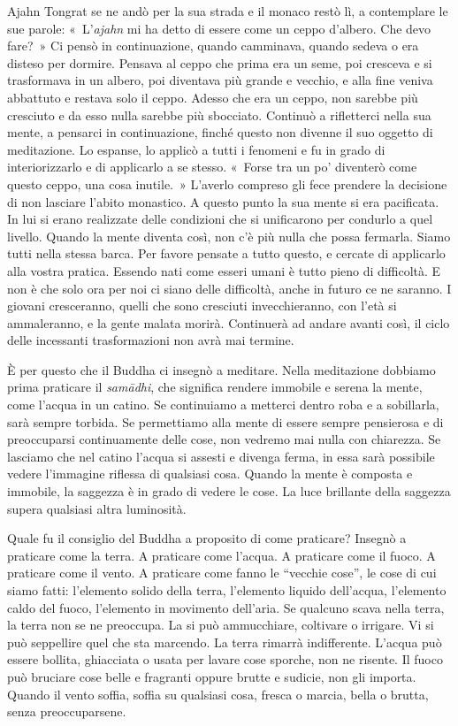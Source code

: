 Ajahn Tongrat se ne andò per la sua strada e il monaco restò lì, a
contemplare le sue parole: «~L'\emph{ajahn} mi ha detto di essere come
un ceppo d'albero. Che devo fare?~» Ci pensò in continuazione, quando
camminava, quando sedeva o era disteso per dormire. Pensava al ceppo che
prima era un seme, poi cresceva e si trasformava in un albero, poi
diventava più grande e vecchio, e alla fine veniva abbattuto e restava
solo il ceppo. Adesso che era un ceppo, non sarebbe più cresciuto e da
esso nulla sarebbe più sbocciato. Continuò a rifletterci nella sua
mente, a pensarci in continuazione, finché questo non divenne il suo
oggetto di meditazione. Lo espanse, lo applicò a tutti i fenomeni e fu
in grado di interiorizzarlo e di applicarlo a se stesso. «~Forse tra un
po' diventerò come questo ceppo, una cosa inutile.~» L'averlo compreso
gli fece prendere la decisione di non lasciare l'abito monastico. A
questo punto la sua mente si era pacificata. In lui si erano realizzate
delle condizioni che si unificarono per condurlo a quel livello. Quando
la mente diventa così, non c'è più nulla che possa fermarla. Siamo tutti
nella stessa barca. Per favore pensate a tutto questo, e cercate di
applicarlo alla vostra pratica. Essendo nati come esseri umani è tutto
pieno di difficoltà. E non è che solo ora per noi ci siano delle
difficoltà, anche in futuro ce ne saranno. I giovani cresceranno, quelli
che sono cresciuti invecchieranno, con l'età si ammaleranno, e la gente
malata morirà. Continuerà ad andare avanti così, il ciclo delle
incessanti trasformazioni non avrà mai termine.

È per questo che il Buddha ci insegnò a meditare. Nella meditazione
dobbiamo prima praticare il \emph{samādhi}, che significa rendere
immobile e serena la mente, come l'acqua in un catino. Se continuiamo a
metterci dentro roba e a sobillarla, sarà sempre torbida. Se permettiamo
alla mente di essere sempre pensierosa e di preoccuparsi continuamente
delle cose, non vedremo mai nulla con chiarezza. Se lasciamo che nel
catino l'acqua si assesti e divenga ferma, in essa sarà possibile vedere
l'immagine riflessa di qualsiasi cosa. Quando la mente è composta e
immobile, la saggezza è in grado di vedere le cose. La luce brillante
della saggezza supera qualsiasi altra luminosità.

Quale fu il consiglio del Buddha a proposito di come praticare? Insegnò
a praticare come la terra. A praticare come l'acqua. A praticare come il
fuoco. A praticare come il vento. A praticare come fanno le ``vecchie
cose'', le cose di cui siamo fatti: l'elemento solido della terra,
l'elemento liquido dell'acqua, l'elemento caldo del fuoco, l'elemento
in movimento dell'aria. Se qualcuno scava nella terra, la terra non se
ne preoccupa. La si può ammucchiare, coltivare o irrigare. Vi si può
seppellire quel che sta marcendo. La terra rimarrà indifferente. L'acqua
può essere bollita, ghiacciata o usata per lavare cose sporche, non ne
risente. Il fuoco può bruciare cose belle e fragranti oppure brutte e
sudicie, non gli importa. Quando il vento soffia, soffia su qualsiasi
cosa, fresca o marcia, bella o brutta, senza preoccuparsene.

